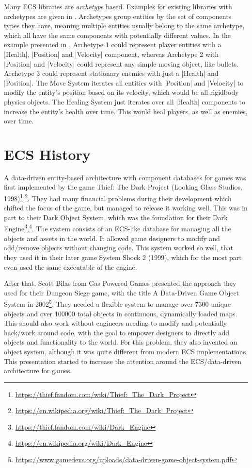 Many ECS libraries are \textit{archetype} based. Examples for existing libraries with archetypes are given in . Archetypes group entities by the set of components types they have, meaning multiple entities usually belong to the same archetype, which all have the same components with potentially different values. In the example presented in , \textsf{Archetype 1} could represent player entities with a |Health|, |Position| and |Velocity| component, whereas \textsf{Archetype 2} with |Position| and |Velocity| could represent any simple moving object, like bullets. \textsf{Archetype 3} could represent stationary enemies with just a |Health| and |Position|. The \textsf{Move System} iterates all entities with |Position| and |Velocity| to modify the entity's position based on its velocity, which would be all rigidbody physics objects. The \textsf{Healing System} just iterates over all |Health| components to increase the entity's health over time. This would heal players, as well as enemies, over time.

\section{ECS History}

A data-driven entity-based architecture with component databases for games was first implemented by the game \textsf{Thief: The Dark Project} (Looking Glass Studios, 1998)\footnote{\url{https://thief.fandom.com/wiki/Thief:_The_Dark_Project}},\footnote{\url{https://en.wikipedia.org/wiki/Thief:_The_Dark_Project}}. They had many financial problems during their development which shifted the focus of the game, but managed to release it working well. This was in part to their \textsf{Dark Object System}, which was the foundation for their \textsf{Dark Engine}\footnote{\url{https://thief.fandom.com/wiki/Dark_Engine}},\footnote{\url{https://en.wikipedia.org/wiki/Dark_Engine}}. The system consists of an ECS-like database for managing all the objects and assets in the world. It allowed game designers to modify and add/remove objects without changing code. This system worked so well, that they used it in their later game \textsf{System Shock 2} (1999), which for the most part even used the same executable of the engine.

After that, Scott Bilas from \textsf{Gas Powered Games} presented the approach they used for their \textsf{Dungeon Siege} game, with the title \textsf{A Data-Driven Game Object System} in 2002\footnote{\url{https://www.gamedevs.org/uploads/data-driven-game-object-system.pdf}}. They needed a flexible system to manage over 7300 unique objects and over 100000 total objects in continuous, dynamically loaded maps. This should also work without engineers needing to modify and potentially hack/work around code, with the goal to empower designers to directly add objects and functionality to the world. For this problem, they also invented an object system, although it was quite different from modern ECS implementations. This presentation started to increase the attention around the ECS/data-driven architecture for games.

